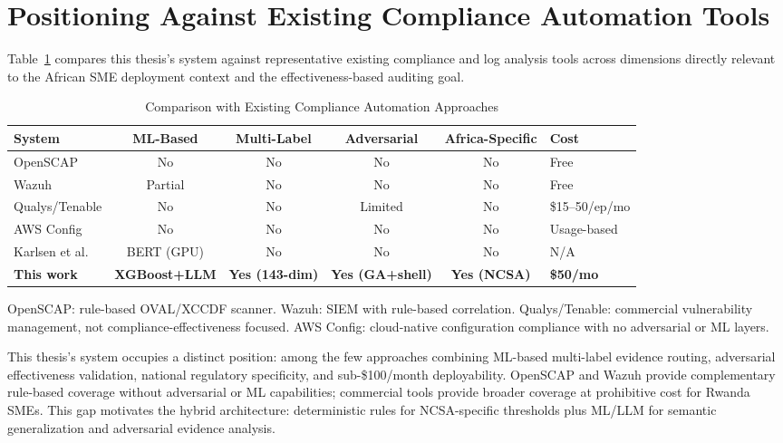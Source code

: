 \documentclass[12pt,oneside]{report}
\begin{document}
\section{Positioning Against Existing Compliance Automation Tools}

Table~\ref{tab:system_comparison} compares this thesis's system against representative existing compliance and log analysis tools across dimensions directly relevant to the African SME deployment context and the effectiveness-based auditing goal.

\begin{table}[H]
\centering
\caption{Comparison with Existing Compliance Automation Approaches}
\label{tab:system_comparison}
\renewcommand{\arraystretch}{1.3}
\footnotesize
\begin{tabular}{|l|c|c|c|c|p{2.2cm}|}
\hline
\textbf{System} & \textbf{ML-Based} & \textbf{Multi-Label} & \textbf{Adversarial} & \textbf{Africa-Specific} & \textbf{Cost} \\
\hline
OpenSCAP \cite{openscap} & No & No & No & No & Free \\
Wazuh \cite{wazuh_ref} & Partial & No & No & No & Free \\
Qualys/Tenable & No & No & Limited & No & \$15--50/ep/mo \\
AWS Config & No & No & No & No & Usage-based \\
Karlsen et al.\ \cite{karlsen2024} & BERT (GPU) & No & No & No & N/A \\
\hline
\textbf{This work} & \textbf{XGBoost+LLM} & \textbf{Yes (143-dim)} & \textbf{Yes (GA+shell)} & \textbf{Yes (NCSA)} & \textbf{\$50/mo} \\
\hline
\end{tabular}
\par\vspace{4pt}
{\footnotesize OpenSCAP: rule-based OVAL/XCCDF scanner. Wazuh: SIEM with rule-based correlation.
Qualys/Tenable: commercial vulnerability management, not compliance-effectiveness focused.
AWS Config: cloud-native configuration compliance with no adversarial or ML layers.}
\end{table}

This thesis's system occupies a distinct position: among the few approaches combining ML-based multi-label evidence routing, adversarial effectiveness validation, national regulatory specificity, and sub-\$100/month deployability. OpenSCAP and Wazuh provide complementary rule-based coverage without adversarial or ML capabilities; commercial tools provide broader coverage at prohibitive cost for Rwanda SMEs. This gap motivates the hybrid architecture: deterministic rules for NCSA-specific thresholds plus ML/LLM for semantic generalization and adversarial evidence analysis.
\end{document}
